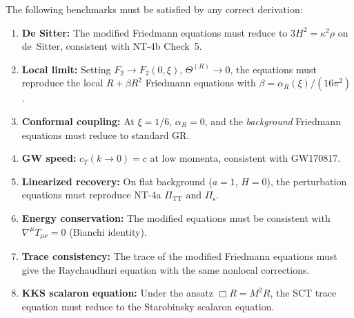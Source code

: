 \documentclass[12pt,a4paper]{article}
\theoremstyle{definition}
\theoremstyle{remark}
\begin{document}
The following benchmarks must be satisfied by any correct derivation:

\begin{enumerate}[label=\textbf{B\arabic*}]
  \item \textbf{De Sitter:} The modified Friedmann equations must
    reduce to $3H^2 = \kappa^2\rho$ on de~Sitter, consistent with
    NT-4b Check~5.
  \item \textbf{Local limit:} Setting $F_2 \to F_2(0,\xi)$,
    $\Theta^{(R)} \to 0$, the equations must reproduce the local
    $R + \beta R^2$ Friedmann equations with
    $\beta = \alpha_R(\xi)/(16\pi^2)$.
  \item \textbf{Conformal coupling:} At $\xi = 1/6$,
    $\alpha_R = 0$, and the \emph{background} Friedmann equations
    must reduce to standard GR.
  \item \textbf{GW speed:} $c_T(k \to 0) = c$ at low momenta,
    consistent with GW170817.
  \item \textbf{Linearized recovery:} On flat background ($a = 1$,
    $H = 0$), the perturbation equations must reproduce NT-4a
    $\Pi_{\mathrm{TT}}$ and $\Pi_{\mathrm{s}}$.
  \item \textbf{Energy conservation:} The modified equations must be
    consistent with $\nabla^\mu T_{\mu\nu} = 0$ (Bianchi identity).
  \item \textbf{Trace consistency:} The trace of the modified
    Friedmann equations must give the Raychaudhuri equation with the
    same nonlocal corrections.
  \item \textbf{KKS scalaron equation:} Under the ansatz
    $\Box R = M^2 R$, the SCT trace equation must reduce to the
    Starobinsky scalaron equation.
\end{enumerate}
\end{document}
